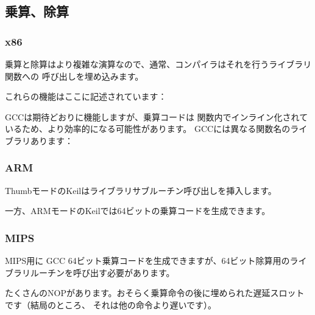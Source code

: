﻿\subsection{乗算、除算}



\subsubsection{x86}



乗算と除算はより複雑な演算なので、通常、コンパイラはそれを行うライブラリ関数への
呼び出しを埋め込みます。

これらの機能はここに記述されています：



GCCは期待どおりに機能しますが、乗算コードは
関数内でインライン化されているため、より効率的になる可能性があります。
GCCには異なる関数名のライブラリあります：

\subsubsection{ARM}

ThumbモードのKeilはライブラリサブルーチン呼び出しを挿入します。



一方、ARMモードのKeilでは64ビットの乗算コードを生成できます。



\subsubsection{MIPS}

MIPS用に \Optimizing GCC 64ビット乗算コードを生成できますが、64ビット除算用のライブラリルーチンを呼び出す必要があります。



たくさんの\ac{NOP}があります。おそらく乗算命令の後に埋められた遅延スロットです（結局のところ、
それは他の命令より遅いです）。

